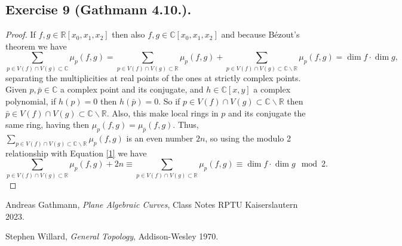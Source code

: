 \documentclass[11pt,a4paper]{article}
\begin{document}
\subsection*{Exercise 9 (Gathmann 4.10.).}
\begin{proof}
  If $ f, g \in \mathbb R[x_0, x_1, x_2] $ then also $ f, g \in \mathbb C[x_0, x_1, x_2] $ and because Bézout's theorem we have
  \begin{equation}
    \label{1}
    \sum_{p \in V(f) \cap V(g) \subset \mathbb C } \mu_p(f,g) = \sum_{p \in V(f) \cap V(g) \subset \mathbb R } \mu_p(f,g) + \sum_{p \in V(f) \cap V(g) \subset \mathbb C \backslash \mathbb R } \mu_p(f,g) = \dim f \cdot \dim g,
  \end{equation}
  separating the multiplicities at real points of the ones at strictly complex points. Given $ p, \bar p \in \mathbb C $ a complex point and its conjugate, and $ h \in \mathbb C[x, y] $ a complex polynomial, if $ h(p) = 0 $ then $ h(\bar p) = 0 $. So if $ p \in V(f) \cap V(g) \subset \mathbb C \backslash \mathbb R $ then $ \bar p \in V(f) \cap V(g) \subset \mathbb C \backslash \mathbb R $. Also, this make local rings in $ p $ and its conjugate the same ring, having then $ \mu_p(f,g) = \mu_{\bar p}(f,g) $. Thus, $ \sum_{p \in V(f) \cap V(g) \subset \mathbb C \backslash \mathbb R } \mu_p(f,g) $ is an even number $2n $, so using the modulo 2 relationship with Equation \ref{1} we have
  $$
  \sum_{p \in V(f) \cap V(g) \subset \mathbb R } \mu_p(f,g) +2n \equiv \sum_{p \in V(f) \cap V(g) \subset \mathbb R } \mu_p(f,g) \equiv \dim f \cdot \dim g \mod 2.
  $$
\end{proof}


\begin{thebibliography}{9}

  Andreas Gathmann,
  \textit{Plane Algebraic Curves},
  Class Notes RPTU Kaiserslautern 2023.

  Stephen Willard,
  \textit{General Topology},
  Addison-Wesley 1970.
  
\end{thebibliography}
\end{document}
